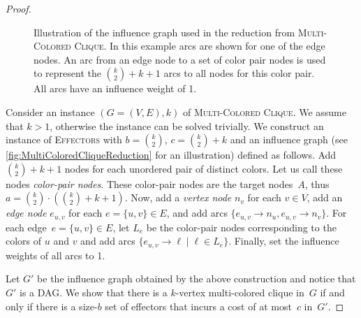 \documentclass{article}
\newcommand{\probColorClique}{\textsc{Multi-Colored Clique}\xspace}
\newcommand{\probEffectors}{\textsc{Effectors}\xspace}
\begin{document}
\begin{proof}
\begin{figure}[t]
  \caption{Illustration of the influence graph used in the reduction from \probColorClique.
  In this example arcs are shown for one of the edge nodes.
  An arc from an edge node to a set of color pair nodes is used to represent the $\binom{k}{2}+k+1$ arcs to all nodes for this color pair.
  All arcs have an influence weight of 1.}
  \label{fig:MultiColoredCliqueReduction}
\end{figure}    
    
    
  Consider an instance $(G = (V, E), k)$ of \probColorClique.
  We assume that $k > 1$, otherwise the instance can be solved trivially.
  We construct an instance of \probEffectors with $b = \binom{k}{2}$, $c
  = \binom{k}{2} + k$ and an influence graph (see \autoref{fig:MultiColoredCliqueReduction} for an illustration) defined
  as follows.
  Add $\binom{k}{2} + k + 1$ nodes for each unordered pair of distinct colors.
  Let us call these nodes \emph{color-pair nodes}. These color-pair nodes are the target nodes~$A$, thus~$a = \binom{k}{2} \cdot (\binom{k}{2}+k+1)$.
  Now, add a \emph{vertex node} $n_v$ for each $v \in V$,
  add an \emph{edge node} $e_{u,v}$ for each $e = \{u, v\} \in E$,
  and add arcs $\{e_{u, v} \rightarrow n_u, e_{u, v} \rightarrow n_v\}$.
  For each edge~$e=\{u,v\}\in E$, let $L_e$ be the color-pair nodes corresponding to the
  colors of $u$ and $v$ and add arcs $\{e_{u, v} \to \ell \mid \ell
  \in L_e \}$.
  Finally, set the influence weights of all arcs to 1.
  
  Let $G'$ be the influence graph obtained by the above construction
  and notice that $G'$ is a DAG.
  We show that there is a $k$-vertex multi-colored clique in~$G$ if
  and only if there is a size-$b$ set of effectors that incurs a
  cost of at most~$c$ in~$G'$.
   

\end{proof}
\end{document}
